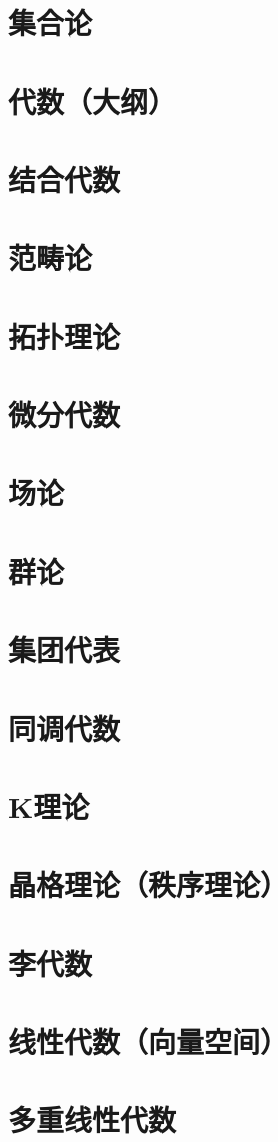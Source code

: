 \documentclass[UTF8]{NatureUniverse}
\begin{document}
\section{集合论}
\section{代数（大纲）}
\section{结合代数}
\section{范畴论}
\section{拓扑理论}
\section{微分代数}
\section{场论}
\section{群论}
\section{集团代表}
\section{同调代数}
\section{K理论}
\section{晶格理论（秩序理论）}
\section{李代数}
\section{线性代数（向量空间）}
\section{多重线性代数}
\end{document}
